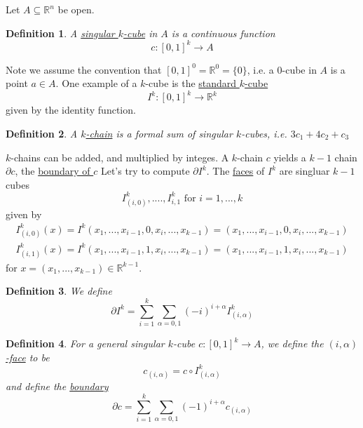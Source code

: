\documentclass{article}
\newtheorem{definition}{Definition}
\newcommand{\reals}[0]{\mathbb{R}}
\begin{document}
Let \(A \subseteq \reals^n\) be open.

\begin{definition}
  A \underline{singular \(k\)-cube} in \(A\) is a continuous function
  \begin{equation}
    c: [0, 1]^k \to A
  \end{equation}
\end{definition}
Note we assume the convention that \([0, 1]^0 = \reals^0 = \{0\}\), i.e. a 0-cube in \(A\) is a point \(a \in A\). One example of a \(k\)-cube is the \underline{standard \(k\)-cube}
\begin{equation}
  I^k: [0, 1]^k \to \reals^k
\end{equation}
given by the identity function.
\begin{definition}
  A \underline{\(k\)-chain} is a formal sum of singular \(k\)-cubes, i.e. \(3c_1 + 4c_2 + c_3\)
\end{definition}
\(k\)-chains can be added, and multiplied by integes.
A \(k\)-chain \(c\) yields a \(k - 1\) chain \(\partial c\), the \underline{boundary of \(c\)}
Let's try to compute \(\partial I^k\). The \underline{faces} of \(I^k\) are singluar \(k - 1\) cubes
\begin{equation}
  I_{(i, 0)}^k,....,I^k_{i, 1} \text{ for } i = 1,...,k
\end{equation}
given by
\begin{equation}
\begin{split}
  I^k_{(i, 0)}(x) = I^k(x_1,...,x_{i - 1},0,x_i,...,x_{k - 1}) = (x_1,...,x_{i - 1},0,x_i,...,x_{k - 1}) \\
  I^k_{(i, 1)}(x) = I^k(x_1,...,x_{i - 1},1,x_i,...,x_{k - 1}) = (x_1,...,x_{i - 1},1,x_i,...,x_{k - 1})
\end{split}
\end{equation}
for \(x = (x_1,...,x_{k - 1}) \in \reals^{k - 1}\).
\begin{definition}
  We define
  \begin{equation}
    \partial I^k = \sum_{i = 1}^k\sum_{\alpha = 0, 1}(-i)^{i + \alpha}I^k_{(i, \alpha)}
  \end{equation}
\end{definition}
\begin{definition}
  For a general singular \(k\)-cube \(c: [0, 1]^k \to A\), we define the \underline{\((i, \alpha)\)-face} to be
  \begin{equation}
    c_{(i, \alpha)} = c \circ I^k_{(i, \alpha)}
  \end{equation}
  and define the \underline{boundary}
  \begin{equation}
    \partial c = \sum_{i = 1}^k\sum_{\alpha = 0, 1}(-1)^{i + \alpha}c_{(i, \alpha)}
  \end{equation}
\end{definition}
\end{document}
